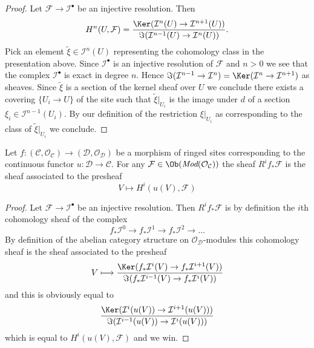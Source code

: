 \begin{proof}
Let $\mathcal{F} \to \mathcal{I}^\bullet$ be an injective resolution.
Then
$$
H^n(U, \mathcal{F}) =
\frac{\Ker(\mathcal{I}^n(U) \to \mathcal{I}^{n + 1}(U))}
{\Im(\mathcal{I}^{n - 1}(U) \to \mathcal{I}^n(U))}.
$$
Pick an element $\tilde \xi \in \mathcal{I}^n(U)$ representing the
cohomology class in the presentation above. Since $\mathcal{I}^\bullet$
is an injective resolution of $\mathcal{F}$ and $n > 0$ we see that
the complex $\mathcal{I}^\bullet$ is exact in degree $n$. Hence
$\Im(\mathcal{I}^{n - 1} \to \mathcal{I}^n) =
\Ker(\mathcal{I}^n \to \mathcal{I}^{n + 1})$ as sheaves.
Since $\tilde \xi$ is a section of the kernel sheaf over $U$
we conclude there exists a covering $\{U_i \to U\}$ of the site
such that $\tilde \xi|_{U_i}$ is the image under $d$ of a section
$\xi_i \in \mathcal{I}^{n - 1}(U_i)$. By our definition of the
restriction $\xi|_{U_i}$ as corresponding to the class of
$\tilde \xi|_{U_i}$ we conclude.
\end{proof}

\begin{lemma}
\label{lemma-higher-direct-images}
Let $f : (\mathcal{C}, \mathcal{O}_\mathcal{C}) \to
(\mathcal{D}, \mathcal{O}_\mathcal{D})$ be a morphism of ringed sites
corresponding to the continuous functor $u : \mathcal{D} \to \mathcal{C}$.
For any $\mathcal{F} \in \Ob(\textit{Mod}(\mathcal{O}_\mathcal{C}))$
the sheaf $R^if_*\mathcal{F}$ is the sheaf associated to the
presheaf
$$
V \longmapsto H^i(u(V), \mathcal{F})
$$
\end{lemma}

\begin{proof}
Let $\mathcal{F} \to \mathcal{I}^\bullet$ be an injective resolution.
Then $R^if_*\mathcal{F}$ is by definition the $i$th cohomology sheaf
of the complex
$$
f_*\mathcal{I}^0 \to f_*\mathcal{I}^1 \to f_*\mathcal{I}^2 \to \ldots
$$
By definition of the abelian category structure on
$\mathcal{O}_\mathcal{D}$-modules
this cohomology sheaf is the sheaf associated to the presheaf
$$
V
\longmapsto
\frac{\Ker(f_*\mathcal{I}^i(V) \to f_*\mathcal{I}^{i + 1}(V))}
{\Im(f_*\mathcal{I}^{i - 1}(V) \to f_*\mathcal{I}^i(V))}
$$
and this is obviously equal to
$$
\frac{\Ker(\mathcal{I}^i(u(V)) \to \mathcal{I}^{i + 1}(u(V)))}
{\Im(\mathcal{I}^{i - 1}(u(V)) \to \mathcal{I}^i(u(V)))} \\
$$
which is equal to $H^i(u(V), \mathcal{F})$
and we win.
\end{proof}






